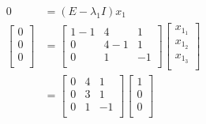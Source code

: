 \documentclass[titlepage]{article}
\begin{document}
\begin{align*}
    0 &= (E-\lambda_1I)x_1\\
    \begin{bmatrix}
        0\\
        0\\
        0\\
    \end{bmatrix}
    &=
    \begin{bmatrix}
        1-1 & 4 & 1\\
        0 & 4-1 & 1\\
        0 & 1 & -1\\
    \end{bmatrix}
    \begin{bmatrix}
        x_{1_1}\\
        x_{1_2}\\
        x_{1_3}\\
    \end{bmatrix}\\
    &=
    \begin{bmatrix}
        0 & 4 & 1\\
        0 & 3 & 1\\
        0 & 1 & -1\\
    \end{bmatrix}
    \begin{bmatrix}
        1\\
        0\\
        0\\
    \end{bmatrix}
\end{align*}
\end{document}
